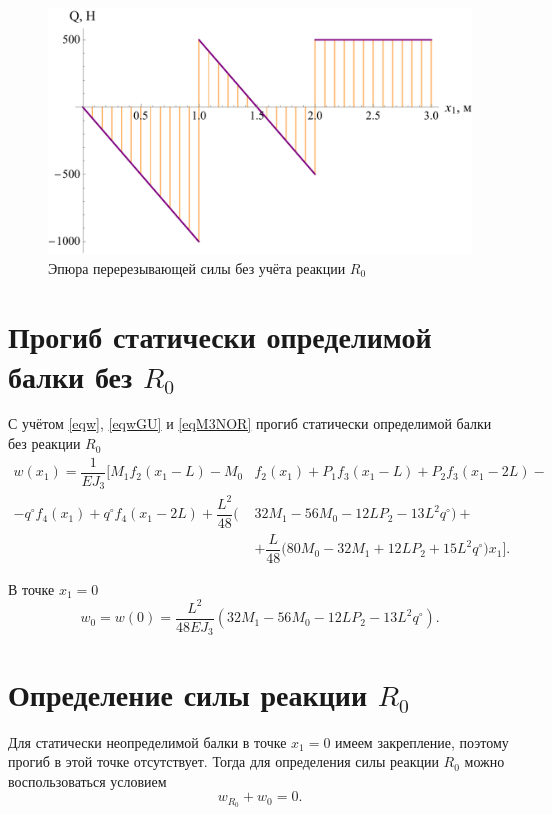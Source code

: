 \documentclass[12pt, a4paper]{article}
\begin{document}
\begin{figure}[!h]
	\centering
	\includegraphics[width=0.7\linewidth]{plot-9}
	\caption{Эпюра перерезывающей силы без учёта реакции $R_0$}
\end{figure}

\vspace{-0.75em}

\section{Прогиб статически определимой балки без $R_0$} 

С учётом \eqref{eqw}, \eqref{eqwGU} и \eqref{eqM3NOR} прогиб статически определимой балки без реакции $R_0$
\begin{equation}
	\begin{split}
		w(x_1) = \dfrac{1}{E J_3} \bigg[ M_1 f_2(x_1 - L) - M_0 & f_2(x_1) + P_1 f_3(x_1 - L) + P_2 f_3(x_1 - 2L) - \\ - q^{\circ} f_4(x_1) + q^{\circ} f_4(x_1 - 2L) + \dfrac{L^2}{48} \big( & 32 M_1 - 56 M_0 - 12L P_2 - 13L^2 q^{\circ} \big) + \\ & + \dfrac{L}{48} \big( 80 M_0 - 32 M_1 + 12L P_2 + 15 L^2 q^{\circ} \big) x_1 \bigg].
	\end{split}
	\label{eqwNOR} 
\end{equation}

В точке $x_1 = 0$
\vspace{-0.5em}
\begin{equation}
	w_{0} = w(0) = \dfrac{L^2}{48 E J_3} \left( 32 M_1 - 56 M_0 - 12L P_2 - 13L^2 q^{\circ} \right).
	\label{eqw0}
\end{equation}

\newpage

\section{Определение силы реакции $R_0$} 

Для статически неопределимой балки в точке $x_1 = 0$ имеем закрепление, поэтому  прогиб в этой точке отсутствует. Тогда для определения силы реакции $R_0$ можно воспользоваться условием 
\[
w_{R_0} + w_0 = 0.
\]
\end{document}
